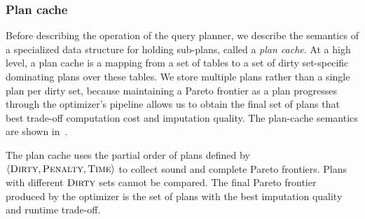 \subsubsection{Plan cache}
Before describing the operation of the query planner, we describe the semantics of a specialized data structure for holding sub-plans, called a \emph{plan cache}.
At a high level, a plan cache is a mapping from a set of tables to a set of dirty set-specific dominating plans over these tables.
We store multiple plans rather than a single plan per dirty set, because maintaining a Pareto frontier as a plan progresses through the optimizer's pipeline
allows us to obtain the final set of plans that best trade-off computation
cost and imputation quality. The plan-cache semantics are shown in~.


\begin{figure}
  \captionsetup{labelfont=bf}
\end{figure}


The plan cache uses the partial order of plans defined by  $\langle \textsc{Dirty}, \textsc{Penalty}, \textsc{Time} \rangle$ to
collect sound and complete Pareto frontiers. Plans with different $\textsc{Dirty}$ sets cannot be compared. The final
Pareto frontier produced by the optimizer is the set of plans with the best imputation
quality and runtime trade-off.

